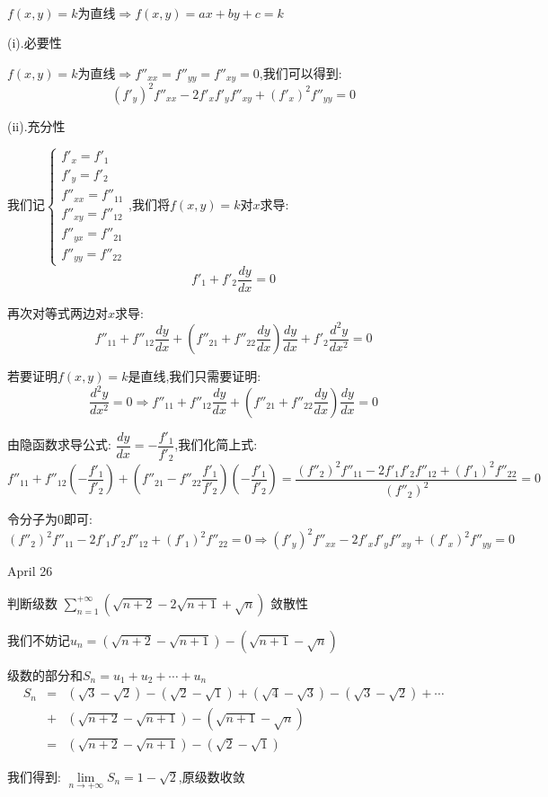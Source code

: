 \begin{solution}
	
	$f(x,y)=k\text{为直线}\Rightarrow f(x,y)=ax+by+c=k$
	
	(i).必要性
	
	$f(x,y)=k\text{为直线}\Rightarrow f''_{xx}=f''_{yy}=f''_{xy}=0$,我们可以得到: $$(f'_{y})^2f''_{xx}-2f'_{x}f'_{y}f''_{xy}+(f'_{x})^2f''_{yy}=0$$
	
	(ii).充分性
	
	我们记$\left\lbrace 
	\begin{array}{l}
		f'_{x}=f'_{1}\\
		f'_{y}=f'_{2}\\
		f''_{xx}=f''_{11}\\
		f''_{xy}=f''_{12}\\
		f''_{yx}=f''_{21}\\
		f''_{yy}=f''_{22}
	\end{array}
	\right. $,我们将$f(x,y)=k$对$x$求导: 
	$$f'_{1}+f'_{2}\frac{dy}{dx}=0$$
	
	再次对等式两边对$x$求导: 
	$$f''_{11}+f''_{12}\frac{dy}{dx}+(f''_{21}+f''_{22}\frac{dy}{dx})\frac{dy}{dx}+f'_{2}\frac{d^2y}{dx^2}=0$$
	
	若要证明$f(x,y)=k$是直线,我们只需要证明: 
	$$\frac{d^2y}{dx^2}=0\Rightarrow f''_{11}+f''_{12}\frac{dy}{dx}+(f''_{21}+f''_{22}\frac{dy}{dx})\frac{dy}{dx}=0$$
	
	由隐函数求导公式: $\dfrac{dy}{dx}=-\dfrac{f'_{1}}{f'_{2}}$,我们化简上式: 
	$$f''_{11}+f''_{12}(-\frac{f'_{1}}{f'_{2}})+(f''_{21}-f''_{22}\frac{f'_{1}}{f'_{2}})(-\frac{f'_{1}}{f'_{2}})=\frac{(f''_{2})^2f''_{11}-2f'_{1}f'_{2}f''_{12}+(f'_{1})^2f''_{22}}{(f''_{2})^2}=0$$
	
	令分子为$0$即可: 
	$$(f''_{2})^2f''_{11}-2f'_{1}f'_{2}f''_{12}+(f'_{1})^2f''_{22}=0\Rightarrow(f'_{y})^2f''_{xx}-2f'_{x}f'_{y}f''_{xy}+(f'_{x})^2f''_{yy}=0$$
\end{solution}


\textcolor{purplea}{April 26}

\begin{example}[][Exam: 30.4.9]
	判断级数 $\sum\limits_{n=1}^{+\infty}(\sqrt{n+2}-2\sqrt{n+1}+\sqrt{n})$ 敛散性
\end{example}

\begin{solution}
	
	我们不妨记$u_{n}=(\sqrt{n+2}-\sqrt{n+1})-(\sqrt{n+1}-\sqrt{n})$
	
	级数的部分和$S_{n}=u_{1}+u_{2}+\cdots+u_{n}$
	\begin{eqnarray*}
		S_{n}&=&(\sqrt{3}-\sqrt{2})-(\sqrt{2}-\sqrt{1})+(\sqrt{4}-\sqrt{3})-(\sqrt{3}-\sqrt{2})+\cdots\\
		&+&(\sqrt{n+2}-\sqrt{n+1})-(\sqrt{n+1}-\sqrt{n})\\
		&=&(\sqrt{n+2}-\sqrt{n+1})-(\sqrt{2}-\sqrt{1})
	\end{eqnarray*}
	
	我们得到: $\lim\limits_{n\to +\infty}S_{n}=1-\sqrt{2}$,原级数收敛
\end{solution}

